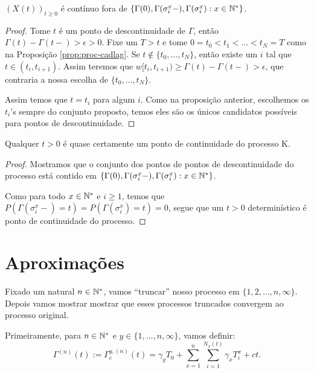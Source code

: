 \begin{proposicao}
  \label{prop:proc-descontinuidades}
  $(X(t))_{t\geq 0}$ é \qc contínuo fora de $\{ \Gamma(0),
  \Gamma(\sigma_i^x-), \Gamma(\sigma_i^x): x \in {\mathbb{N^*}}\}$.
\end{proposicao}
\begin{proof}
  Tome $t$ é um ponto de descontinuidade de $\Gamma$, então $\Gamma(t) -
  \Gamma(t-) > \epsilon > 0$. Fixe um $T > t$ e tome $0 = t_0 < t_1 <
  \ldots < t_N = T$ como na Proposição \ref{prop:proc-cadlag}. Se
  $t \not\in \{t_0, \ldots, t_N\}$, então existe um $i$ tal que $t \in
  (t_i, t_{i+1})$. Assim teremos que $w[t_i, t_{i+1}) \geq \Gamma(t) -
  \Gamma(t-) > \epsilon$, que contraria a nossa escolha de $\{t_0,
  \ldots, t_N\}$.

  Assim temos que $t = t_i$ para algum $i$. Como na proposição
  anterior, escolhemos os $t_i$'s sempre do conjunto proposto, temos
  eles são os únicos candidatos possíveis para pontos de
  descontinuidade.
\end{proof}

\begin{corolario}
  \label{cor:continuidades-processo}
  Qualquer $t > 0$ é quase certamente um ponto de continuidade do
  processo K.
\end{corolario}
\begin{proof}
  Mostramos que o conjunto dos pontos de pontos de descontinuidade do
  processo está contido em $\{ \Gamma(0), \Gamma(\sigma_i^x-),
  \Gamma(\sigma_i^x): x \in {\mathbb{N^*}}\}$.

  Como para todo $x \in {\mathbb{N^*}}$ e $i \geq 1$, temos que
  $P(\Gamma(\sigma_i^x-) = t) = P(\Gamma(\sigma_i^x) = t) = 0$, segue
  que um $t > 0$ determinístico é ponto de continuidade do processo.
\end{proof}



\section{Aproximações}
\label{sec:aproximacoes}

Fixado um natural $n \in {\mathbb{N^*}}$, vamos ``truncar'' nosso processo em
$\{1, 2, \ldots, n, \infty\}$. Depois vamos mostrar mostrar que esses
processos truncados convergem ao processo original.

Primeiramente, para $n \in {\mathbb{N^*}}$ e $y \in \{1, \ldots, n, \infty\}$,
vamos definir:
\begin{equation}
  \Gamma^{(n)} (t) := \Gamma^{y,(n)}_c (t) = \gamma_y T_0
  + \sum_{x =1}^{n} \sum_{i = 1}^{N_x(t)}
  \gamma_x T_i^x
  + ct.
\end{equation}

